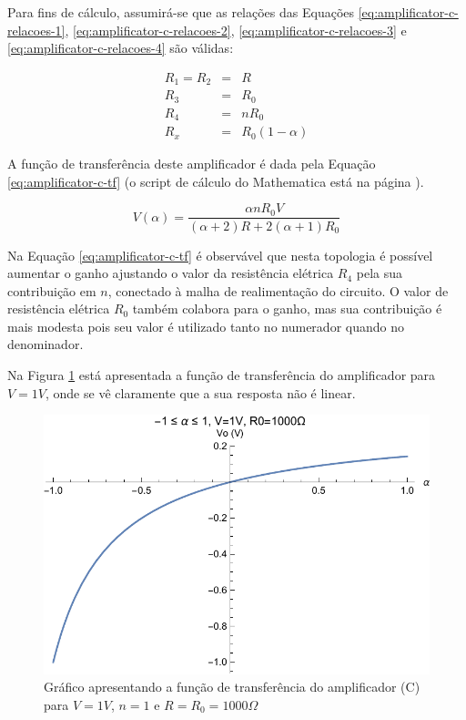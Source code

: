 \documentclass[a4paper]{instrumentacao}
\begin{document}
Para fins de cálculo, assumirá-se que as relações das Equações \ref{eq:amplificator-c-relacoes-1}, \ref{eq:amplificator-c-relacoes-2}, \ref{eq:amplificator-c-relacoes-3} e \ref{eq:amplificator-c-relacoes-4} são válidas:

\begin{eqnarray}
	R_1 = R_2 &=& R \label{eq:amplificator-c-relacoes-1} \\
	R_3 &=& R_0  		\label{eq:amplificator-c-relacoes-2} \\
	R_4 &=& n R_0 		\label{eq:amplificator-c-relacoes-3} \\
	R_x &=& R_0(1-\alpha) 	\label{eq:amplificator-c-relacoes-4} 
\end{eqnarray}

A função de transferência deste amplificador é dada pela Equação \ref{eq:amplificator-c-tf} (o script de cálculo do Mathematica está na página \pageref{att:amplificadores}).

\begin{equation}
	V(\alpha) = \frac{\alpha n R_0 V}{(\alpha +2) R+2 (\alpha +1) R_0}
	\label{eq:amplificator-c-tf}
\end{equation}

Na Equação \ref{eq:amplificator-c-tf} é observável que nesta topologia é possível aumentar o ganho ajustando o valor da resistência elétrica $R_4$ pela sua contribuição em $n$, conectado à malha de realimentação do circuito. O valor de resistência elétrica $R_0$ também colabora para o ganho, mas sua contribuição é mais modesta pois seu valor é utilizado tanto no numerador quando no denominador.

Na Figura \ref{fig:amplificador-c-tf} está apresentada a função de transferência do amplificador para $V=1V$, onde se vê claramente que a sua resposta não é linear.

\begin{figure}[H]
\center
\includegraphics[width=\textwidth]{Amplificador-C-TF.pdf}
\caption{Gráfico apresentando a função de transferência do amplificador (C) para $V=1V$, $n=1$ e $R = R_0 = 1000\Omega$}
\label{fig:amplificador-c-tf}
\end{figure}
\end{document}
